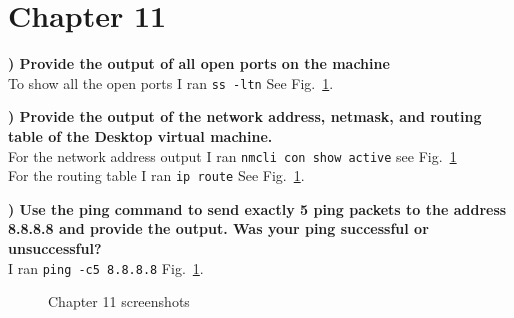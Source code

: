 \documentclass{report}
\newcommand{\mysection}[1]{\section*{#1}}
\newcommand{\mysubsection}[2]{\textbf{\romannumeral #1) #2}}
\begin{document}
\clearpage

\mysection{\textbf{Chapter 11}}


\mysubsection{1}{Provide the output of all open ports on the machine}
\\To show all the open ports I
ran {\scriptsize{\verb$ss -ltn$}\normalsize} See
Fig.~\ref{Ch11}.


\noindent\mysubsection{2}{Provide the output of the network address, netmask, and
routing table of the Desktop virtual machine.}
\\For the network address output I 
ran {\scriptsize{\verb$nmcli con show active$}\normalsize} see
Fig.~\ref{Ch11}
\\For the routing table I ran {\scriptsize{\verb$ip route$}\normalsize} See
Fig.~\ref{Ch11}.

\noindent\mysubsection{3}{Use the ping command to send exactly 5 ping packets to the
address 8.8.8.8 and provide the output. Was your ping successful or
unsuccessful?}
\\I ran {\scriptsize{\verb$ping -c5 8.8.8.8$}\normalsize}
Fig.~\ref{Ch11}.


\begin{figure}[!b]\centering
{}\par
{}\hfill
{}\par
{}\hfill
{}\par
\caption{Chapter 11 screenshots}
\label{Ch11}
\end{figure}
\end{document}
